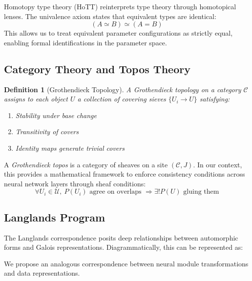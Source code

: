 \documentclass{article}
\newtheorem{definition}{Definition}[section]
\begin{document}
Homotopy type theory (HoTT) \citep{hottbook} reinterprets type theory through homotopical lenses. The univalence axiom states that equivalent types are identical:
\begin{equation}
    (A \simeq B) \simeq (A = B)
\end{equation}
This allows us to treat equivalent parameter configurations as strictly equal, enabling formal identifications in the parameter space.

\subsection{Category Theory and Topos Theory}
\begin{definition}[Grothendieck Topology]
A \emph{Grothendieck topology} on a category $\mathcal{C}$ assigns to each object $U$ a collection of covering sieves $\{U_i \to U\}$ satisfying:
\begin{enumerate}
    \item Stability under base change
    \item Transitivity of covers
    \item Identity maps generate trivial covers
\end{enumerate}
\end{definition}

A \emph{Grothendieck topos} \citep{grothendieck1972} is a category of sheaves on a site $(\mathcal{C}, J)$. In our context, this provides a mathematical framework to enforce consistency conditions across neural network layers through sheaf conditions:
\begin{equation}
    \forall U_i \in \mathcal{U},\ P(U_i) \text{ agree on overlaps } \Rightarrow \exists! P(U) \text{ gluing them}
\end{equation}

\subsection{Langlands Program}
The Langlands correspondence posits deep relationships between automorphic forms and Galois representations. Diagrammatically, this can be represented as:
\begin{center}
\end{center}
We propose an analogous correspondence between neural module transformations and data representations.
\end{document}
